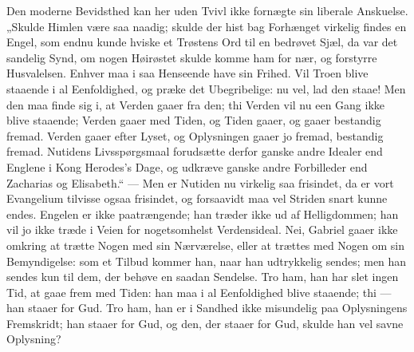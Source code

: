 \documentclass[12pt,a4paper]{book}
\begin{document}
Den moderne Bevidsthed kan her uden Tvivl ikke fornægte sin liberale
Anskuelse. „Skulde Himlen være saa naadig; skulde der hist bag
Forhænget virkelig findes en Engel, som endnu kunde hviske et Trøstens
Ord til en bedrøvet Sjæl, da var det sandelig Synd, om nogen Høirøstet
skulde komme ham for nær, og forstyrre Husvalelsen. Enhver maa i saa
Henseende have sin Frihed. Vil Troen blive staaende i al Eenfoldighed,
og præke det Ubegribelige: nu vel, lad den staae! Men den maa finde sig
i, at Verden gaaer fra den; thi Verden vil nu een Gang ikke blive
staaende; Verden gaaer med Tiden, og Tiden gaaer, og gaaer bestandig
fremad. Verden gaaer efter Lyset, og Oplysningen gaaer jo fremad,
bestandig fremad. Nutidens Livsspørgsmaal forudsætte derfor ganske
andre Idealer end Englene i Kong Herodes's Dage, og udkræve ganske
andre Forbilleder end Zacharias og Elisabeth.“ --- Men er Nutiden nu
virkelig saa frisindet, da er vort Evangelium tilvisse ogsaa frisindet,
og forsaavidt maa vel Striden snart kunne endes. Engelen er ikke
paatrængende; han træder ikke ud af Helligdommen; han vil jo ikke træde
i Veien for nogetsomhelst Verdensideal. Nei, Gabriel gaaer ikke omkring
at trætte Nogen med sin Nærværelse, eller at trættes med Nogen om sin
Bemyndigelse: som et Tilbud kommer han, naar han udtrykkelig sendes;
men han sendes kun til dem, der behøve en saadan Sendelse. Tro ham, han
har slet ingen Tid, at gaae frem med Tiden: han maa i al Eenfoldighed
blive staaende; thi --- han staaer for Gud. Tro ham, han er i Sandhed
ikke misundelig paa Oplysningens Fremskridt; han staaer for Gud, og
den, der staaer for Gud, skulde han vel savne Oplysning?
\end{document}
